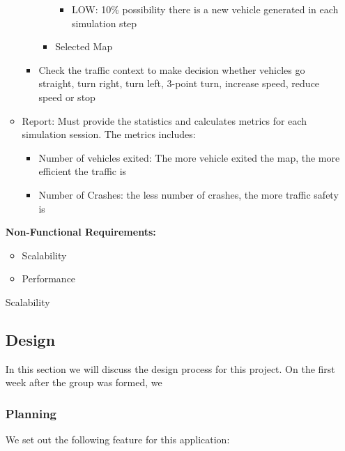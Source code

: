 \documentclass[11pt]{article}
\begin{document}
\begin{itemize}
\begin{itemize}
\begin{itemize}
\begin{itemize}
\begin{itemize}
                \item LOW: 10\% possibility there is a new vehicle generated in each simulation step
                \end{itemize}
            \item Selected Map
            
            
            \end{itemize}
        
        \item Check the traffic context to make decision whether vehicles go straight, turn right, turn left, 3-point turn, increase speed, reduce speed or stop
        \end{itemize}
        
        
       
        \item Report: Must provide the statistics and calculates     metrics  for each simulation session. The metrics includes:
        \begin{itemize}
        \item Number of vehicles exited: The more vehicle exited the map, the more efficient the traffic is 
        \item Number of Crashes: the less number of crashes, the more traffic safety is
        
        \end{itemize}
        
        
        \end{itemize}


    
    {\bf{Non-Functional Requirements:}} \newline
    \begin{itemize}
    \item Scalability
    \item Performance
    \
    \end{itemize}
    \indent Scalability
    
    
	
\subsection{Design}
In this section we will discuss the design process for this project. On the first week after the group was formed, we 

    \subsubsection{Planning}
    We set out the following feature for this application:
    

\end{itemize}
\end{document}

